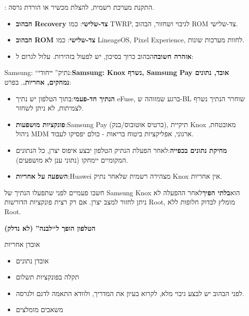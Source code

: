 : התקנת מערכת רשמית, להצלת מכשיר או הורדת גרסה.

\begin{itemize}
  \item \textbf{הבהוב Recovery צד-שלישי}: כמו TWRP, לגיבוי ושחזור, הבהוב ROM צד-שלישי.
  \item \textbf{הבהוב ROM צד-שלישי}: כמו LineageOS, Pixel Experience, לחוות מערכות שונות.
  \item \textbf{אזהרה חשובה}הבהוב כרוך בסיכון, יש לפעול בזהירות. עלול לגרום ל:
\end{itemize}


Samsung: “נתיק” ייחודי:\textbf{Samsung: Knox נשרף, Samsung Pay אובד, נתונים נמחקים, אחריות.}. בפרט:

\begin{itemize}
  \item \textbf{הנתיך חד-פעמי}:בתוך הטלפון יש נתיך eFuse, ברגע שמזוהה ש-BL שוחרר הנתיך נשרף לצמיתות, לא ניתן לשחזר.
  \item \textbf{פונקציות מושפעות}:Samsung Pay (כרטיס אוטובוס/בנק), תיקיית Knox מאובטחת, ניהול MDM ארגוני, אפליקציות ביטוח בריאות - כולם יפסיקו לעבוד.
  \item \textbf{מחיקת נתונים בכפייה}:לאחר הפעלת הנתיק הטלפון יבצע איפוס יצרן, כל הנתונים המקומיים יימחקו (נתוני ענן לא מושפעים).
  \item \textbf{השפעה על אחריות}:Huawei מצהירה רשמית שלאחר נתיק Knox אין אחריות.
\end{itemize}

\begin{tcbwarn}{חשבו פעמיים לפני שתפעלו}
הנתיך של Samsung Knox הוא\textbf{בלתי הפיך}לאחר ההפעלה לא ניתן לחזור למצב יצרן. אם רק רצית פונקציות הדורשות Root, מומלץ לבדוק חלופות ללא Root.

\end{tcbwarn}

\textbf{הטלפון הופך ל“לבנה” (לא נדלק)}\par

אובדן אחריות

\begin{itemize}
  \item אובדן נתונים
  \item תקלה בפונקציות תשלום
  \item לפני הבהוב יש לבצע גיבוי מלא, לקרוא בעיון את המדריך, ולוודא התאמה לדגם ולגרסה.
  \item משאבים מומלצים
\end{itemize}

